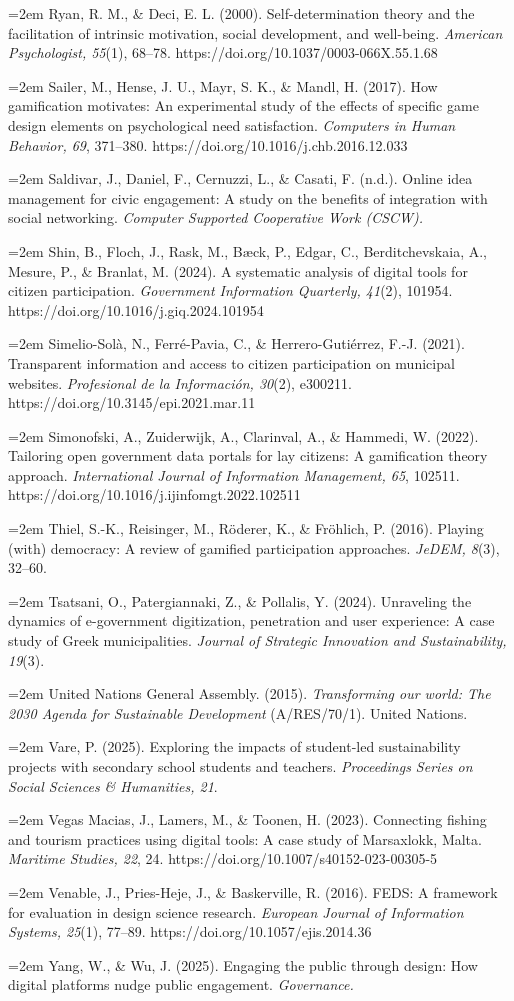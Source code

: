 \documentclass[11pt,a4paper]{article}
\newcommand{\refitem}[1]{\noindent\hangindent=2em\hangafter=1 #1\par\smallskip}
\begin{document}
\refitem{Ryan, R. M., \& Deci, E. L. (2000). Self-determination theory and the facilitation of intrinsic motivation, social development, and well-being. \emph{American Psychologist, 55}(1), 68--78. https://doi.org/10.1037/0003-066X.55.1.68}
\refitem{Sailer, M., Hense, J. U., Mayr, S. K., \& Mandl, H. (2017). How gamification motivates: An experimental study of the effects of specific game design elements on psychological need satisfaction. \emph{Computers in Human Behavior, 69}, 371--380. https://doi.org/10.1016/j.chb.2016.12.033}
\refitem{Saldivar, J., Daniel, F., Cernuzzi, L., \& Casati, F. (n.d.). Online idea management for civic engagement: A study on the benefits of integration with social networking. \emph{Computer Supported Cooperative Work (CSCW).}}
\refitem{Shin, B., Floch, J., Rask, M., B\ae ck, P., Edgar, C., Berditchevskaia, A., Mesure, P., \& Branlat, M. (2024). A systematic analysis of digital tools for citizen participation. \emph{Government Information Quarterly, 41}(2), 101954. https://doi.org/10.1016/j.giq.2024.101954}
\refitem{Simelio-Sol\`a, N., Ferr\'e-Pavia, C., \& Herrero-Guti\'errez, F.-J. (2021). Transparent information and access to citizen participation on municipal websites. \emph{Profesional de la Informaci\'on, 30}(2), e300211. https://doi.org/10.3145/epi.2021.mar.11}
\refitem{Simonofski, A., Zuiderwijk, A., Clarinval, A., \& Hammedi, W. (2022). Tailoring open government data portals for lay citizens: A gamification theory approach. \emph{International Journal of Information Management, 65}, 102511. https://doi.org/10.1016/j.ijinfomgt.2022.102511}
\refitem{Thiel, S.-K., Reisinger, M., R\"oderer, K., \& Fr\"ohlich, P. (2016). Playing (with) democracy: A review of gamified participation approaches. \emph{JeDEM, 8}(3), 32--60.}
\refitem{Tsatsani, O., Patergiannaki, Z., \& Pollalis, Y. (2024). Unraveling the dynamics of e-government digitization, penetration and user experience: A case study of Greek municipalities. \emph{Journal of Strategic Innovation and Sustainability, 19}(3).}
\refitem{United Nations General Assembly. (2015). \emph{Transforming our world: The 2030 Agenda for Sustainable Development} (A/RES/70/1). United Nations.}
\refitem{Vare, P. (2025). Exploring the impacts of student-led sustainability projects with secondary school students and teachers. \emph{Proceedings Series on Social Sciences \& Humanities, 21}.}
\refitem{Vegas Macias, J., Lamers, M., \& Toonen, H. (2023). Connecting fishing and tourism practices using digital tools: A case study of Marsaxlokk, Malta. \emph{Maritime Studies, 22}, 24. https://doi.org/10.1007/s40152-023-00305-5}
\refitem{Venable, J., Pries-Heje, J., \& Baskerville, R. (2016). FEDS: A framework for evaluation in design science research. \emph{European Journal of Information Systems, 25}(1), 77--89. https://doi.org/10.1057/ejis.2014.36}
\refitem{Yang, W., \& Wu, J. (2025). Engaging the public through design: How digital platforms nudge public engagement. \emph{Governance.}}
\end{document}
